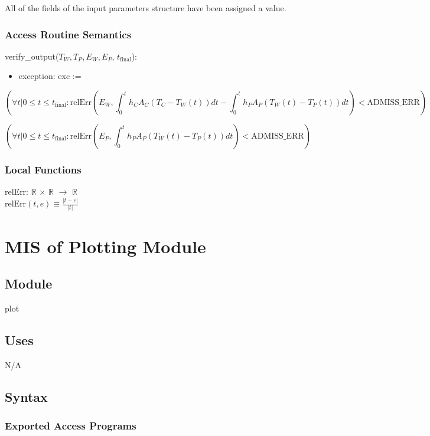 \documentclass[12pt, titlepage]{article}
\begin{document}
All of the fields of the input parameters structure have been assigned a
value.  

\subsubsection{Access Routine Semantics}

\noindent verify\_output($T_W, T_P, E_W, E_P$, $t_\text{final}$):
\begin{itemize}
\item exception: exc := 
\end{itemize}

$$
(\forall t | 0 \leq t \leq t_\text{final} : \text{relErr}(E_W,
\int_{0}^{t} h_C A_C (T_C - T_W(t)) dt - \int_{0}^{t} h_P A_P (T_W(t)
- T_P(t)) dt) < \text{ADMISS\_ERR})
$$

$$
(\forall t | 0 \leq t \leq t_\text{final} : \text{relErr}(E_{P},
\int_{0}^{t} h_{P} A_{P} (T_{W}(t) - T_{P}(t)) dt) < \text{ADMISS\_ERR})
$$

\subsubsection{Local Functions}

relErr: $\mathbb{R}$ $\times$ $\mathbb{R}$ $\rightarrow$ $\mathbb{R}$ \\
$\text{relErr}(t, e) \equiv \frac{|t - e|}{|t|}$ \\
\newline

\newpage
\section{MIS of Plotting Module} \label{Plot}

\subsection{Module}

plot

\subsection{Uses}

N/A

\subsection{Syntax}

\subsubsection{Exported Access Programs}
\end{document}
